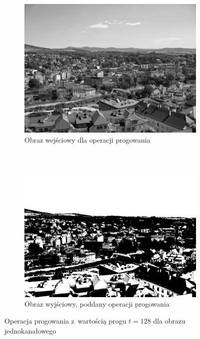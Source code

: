 \begin{figure}
  \centering
  \begin{subfigure}[b]{0.45\textwidth}
    \includegraphics[width=\textwidth]{img/threshold-before}
    \caption{Obraz wejściowy dla operacji progowania}
    \label{fig:threshold_before}
  \end{subfigure}
  ~
  \begin{subfigure}[b]{0.45\textwidth}
    \includegraphics[width=\textwidth]{img/threshold-after}
    \caption{Obraz wyjściowy, poddany operacji progowania}
    \label{fig:threshold_after}
  \end{subfigure}
  \caption{Operacja progowania z~wartością progu $t=128$ dla obrazu jednokanałowego}\label{fig:threshold_image}
\end{figure}

